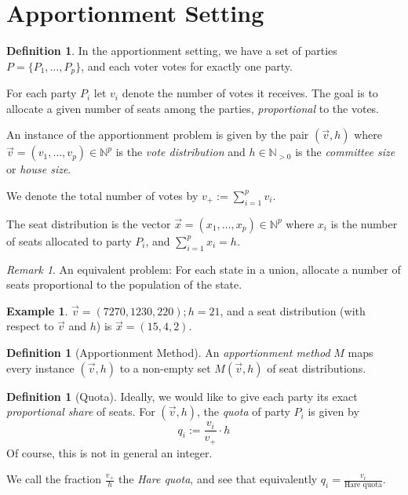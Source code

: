 \documentclass{book}
\theoremstyle{plain}
\theoremstyle{definition}
\newtheorem{definition}[theorem]{Definition}
\newtheorem{example}[theorem]{Example}
\theoremstyle{remark}
\newtheorem{remark}[theorem]{Remark}
\begin{document}
\section{Apportionment Setting}

\begin{definition}
    In the apportionment setting,
    we have a set of parties $P = \{P_1, \dots, P_p\}$, and 
    each voter votes for exactly one party. 

    For each party $P_i$ let $v_i$ denote the number of votes it receives.
    The goal is to allocate a given number of seats among the parties, 
    \emph{proportional} to the votes.

    An instance of the apportionment problem is given by the pair 
    $(\vec{v}, h)$ where $\vec{v} = (v_1, \dots, v_p) \in \mathbb{N}^p$
    is the \emph{vote distribution} and $h \in \mathbb{N}_{>0}$ is the 
    \emph{committee size} or \emph{house size}.

    We denote the total number of votes by 
    $v_+ := \sum_{i=1}^p v_i$.

    The seat distribution is the vector 
    $\vec{x} = (x_1, \dots, x_p) \in \mathbb{N}^p$ where $x_i$ is the number of seats allocated to party $P_i$,
    and $\sum_{i=1}^p x_i = h$.
\end{definition}

\begin{remark}
    An equivalent problem: For each state in a union, 
    allocate a number of seats proportional to the 
    population of the state.
\end{remark}

\begin{example}
    $\vec{v} = (7270, 1230, 220); h = 21$, and a 
    seat distribution (with respect to $\vec{v}$ and $h$) is $\vec{x} = (15, 4, 2)$.
\end{example}

\begin{definition}[Apportionment Method]
    An \emph{apportionment method} $M$ maps 
    every instance $(\vec{v}, h)$ to a non-empty set $M(\vec{v}, h)$ of seat distributions.
\end{definition}

\begin{definition}[Quota]
    Ideally, we would like to give each party its exact \emph{proportional share} of seats.
    For $(\vec{v}, h)$, the \emph{quota} of party $P_i$ is 
    given by 
    \[
        q_i := \frac{v_i}{v_+} \cdot h
    \]
    Of course, this is not in general an integer.

    We call the fraction 
    $\frac{v_+}{h}$ the \emph{Hare quota}, 
    and see that equivalently 
    $
    q_i = \frac{v_i}{\text{Hare quota}}$.
\end{definition}
\end{document}
